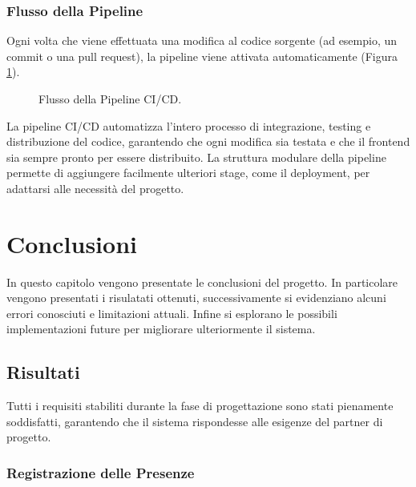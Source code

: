 \documentclass[twoside]{supsistudent}
\begin{document}
\subsection{Flusso della Pipeline}

Ogni volta che viene effettuata una modifica al codice sorgente (ad esempio, un commit o una pull request), la pipeline viene attivata automaticamente (Figura \ref{fig:pipeline}).

\begin{figure}[ht]
  \centering
  \caption{Flusso della Pipeline CI/CD.}
  \label{fig:pipeline}
\end{figure}



La pipeline CI/CD automatizza l'intero processo di integrazione, testing e distribuzione del codice, garantendo che ogni modifica sia testata e che il frontend sia sempre pronto per essere distribuito. La struttura modulare della pipeline permette di aggiungere facilmente ulteriori stage, come il deployment, per adattarsi alle necessità del progetto.


\chapter{Conclusioni}

In questo capitolo vengono presentate le conclusioni del progetto. In particolare vengono presentati i risulatati ottenuti, successivamente si evidenziano alcuni errori conosciuti e limitazioni attuali. Infine si esplorano le possibili implementazioni future per migliorare ulteriormente il sistema.

\section{Risultati}

Tutti i requisiti stabiliti durante la fase di progettazione sono stati pienamente soddisfatti, garantendo che il sistema rispondesse alle esigenze del partner di progetto.

\subsection{Registrazione delle Presenze}
\end{document}
